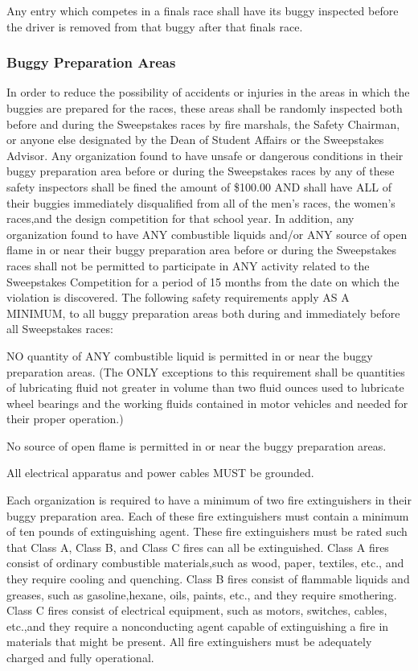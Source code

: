 \documentclass[openany]{book}
\begin{document}
Any entry which competes in a finals race shall have its buggy inspected before the driver is removed from that buggy after that finals race.

\subsubsection{Buggy Preparation Areas}

In order to reduce the possibility of accidents or injuries in the areas in which the buggies are prepared for the races, these areas shall be randomly inspected both before and during the Sweepstakes races by fire marshals, the Safety Chairman, or anyone else designated by the Dean of Student Affairs or the Sweepstakes Advisor. Any organization found to have unsafe or dangerous conditions in their buggy preparation area before or during the Sweepstakes races by any of these safety inspectors shall be fined the amount of \$100.00 AND shall have ALL of their buggies immediately disqualified from all of the men's races, the women's races,and the design competition for that school year. In addition, any organization found to have ANY combustible liquids and/or ANY source of open flame in or near their buggy preparation area before or during the Sweepstakes races shall not be permitted to participate in ANY activity related to the Sweepstakes Competition for a period of 15 months from the date on which the violation is discovered. The following safety requirements apply AS A MINIMUM, to all buggy preparation areas both during and immediately before all Sweepstakes races:

NO quantity of ANY combustible liquid is permitted in or near the buggy preparation areas. (The ONLY exceptions to this requirement shall be quantities of lubricating fluid not greater in volume than two fluid ounces used to lubricate wheel bearings and the working fluids contained in motor vehicles and needed for their proper operation.)

No source of open flame is permitted in or near the buggy preparation areas.

All electrical apparatus and power cables MUST be grounded.

Each organization is required to have a minimum of two fire extinguishers in their buggy preparation area. Each of these fire extinguishers must contain a minimum of ten pounds of extinguishing agent. These fire extinguishers must be rated such that Class A, Class B, and Class C fires can all be extinguished. Class A fires consist of ordinary combustible materials,such as wood, paper, textiles, etc., and they require cooling and quenching. Class B fires consist of flammable liquids and greases, such as gasoline,hexane, oils, paints, etc., and they require smothering. Class C fires consist of electrical equipment, such as motors, switches, cables, etc.,and they require a nonconducting agent capable of extinguishing a fire in materials that might be present. All fire extinguishers must be adequately charged and fully operational.
\end{document}
